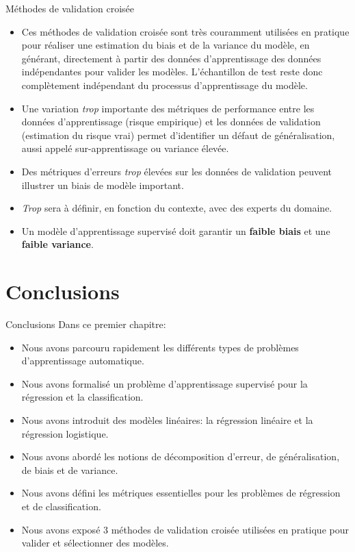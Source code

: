 \documentclass[10pt]{beamer}  %
\begin{document}
\begin{frame}{Méthodes de validation croisée}
	\begin{itemize}
		\item Ces méthodes de validation croisée sont très couramment utilisées en pratique pour réaliser une estimation du biais et de la variance du modèle, en générant, directement à partir des données d'apprentissage des données indépendantes pour valider les modèles. L'échantillon de test reste donc complètement indépendant du processus d'apprentissage du modèle.
		\pause
		\item Une variation \textit{trop} importante des métriques de performance entre les données d'apprentissage (risque empirique) et les données de validation (estimation du risque vrai) permet d'identifier un défaut de généralisation, aussi appelé sur-apprentissage ou variance élevée.
		\pause
		\item Des métriques d'erreurs \textit{trop} élevées sur les données de validation peuvent illustrer un biais de modèle important.
		\pause
		\item \textit{Trop} sera à définir, en fonction du contexte, avec des experts du domaine.
		\pause
		\item Un modèle d'apprentissage supervisé doit garantir un \textbf{faible biais} et une \textbf{faible variance}.
	\end{itemize}
\end{frame}


\section[Conclusions]{Conclusions}

\begin{frame}{Conclusions}
	Dans ce premier chapitre:
	\begin{itemize}
		\item Nous avons parcouru rapidement les différents types de problèmes d'apprentissage automatique.
		\item Nous avons formalisé un problème d'apprentissage supervisé pour la régression et la classification.
		\item Nous avons introduit des modèles linéaires: la régression linéaire et la régression logistique.
		\item Nous avons abordé les notions de décomposition d'erreur, de généralisation, de biais et de variance.
		\item Nous avons défini les métriques essentielles pour les problèmes de régression et de classification.
		\item Nous avons exposé 3 méthodes de validation croisée utilisées en pratique pour valider et sélectionner des modèles.
	\end{itemize}
\end{frame}
\end{document}
